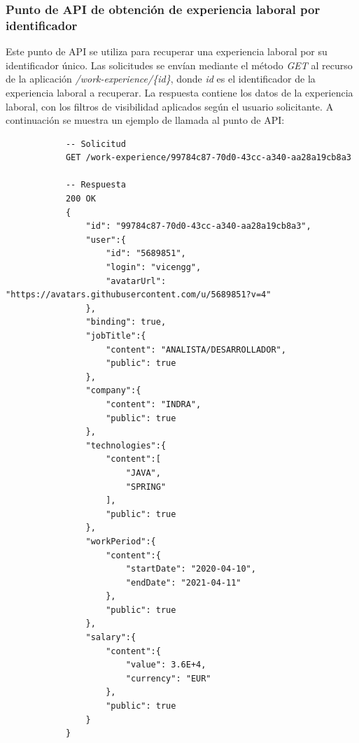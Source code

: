 \documentclass[a4paper, 12pt]{book}
\begin{document}
    \subsubsection{Punto de API de obtención de experiencia laboral por identificador}
    \label{subsec:get_work_experience_id}
    Este punto de API se utiliza para recuperar una experiencia laboral por su identificador único.
    Las solicitudes se envían mediante el método \emph{GET} al recurso de la aplicación \emph{/work-experience/\{id\}}, donde \emph{id} es el identificador de la experiencia laboral a recuperar.
    La respuesta contiene los datos de la experiencia laboral, con los filtros de visibilidad aplicados según el usuario solicitante.
    A continuación se muestra un ejemplo de llamada al punto de API:

        {\scriptsize
    \linespread{1}
    \begin{verbatim}
			-- Solicitud
			GET /work-experience/99784c87-70d0-43cc-a340-aa28a19cb8a3

			-- Respuesta
			200 OK
			{
			    "id": "99784c87-70d0-43cc-a340-aa28a19cb8a3",
			    "user":{
			        "id": "5689851",
			        "login": "vicengg",
			        "avatarUrl": "https://avatars.githubusercontent.com/u/5689851?v=4"
			    },
			    "binding": true,
			    "jobTitle":{
			        "content": "ANALISTA/DESARROLLADOR",
			        "public": true
			    },
			    "company":{
			        "content": "INDRA",
			        "public": true
			    },
			    "technologies":{
			        "content":[
			            "JAVA",
			            "SPRING"
			        ],
			        "public": true
			    },
			    "workPeriod":{
			        "content":{
			            "startDate": "2020-04-10",
			            "endDate": "2021-04-11"
			        },
			        "public": true
			    },
			    "salary":{
			        "content":{
			            "value": 3.6E+4,
			            "currency": "EUR"
			        },
			        "public": true
			    }
			}
    \end{verbatim}
    }
\end{document}
